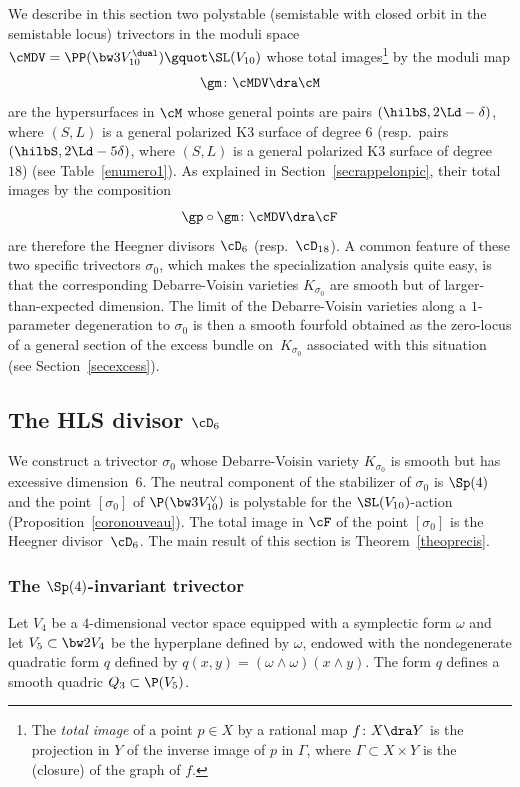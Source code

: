 We describe in this section two polystable (semistable with closed orbit in the semistable locus) trivectors in the moduli space
$\cMDV=\PP(\bw3 V_{10}^\dual) \gquot \SL(V_{10})
$ whose total images\footnote{The \emph{total image} of a point $p\in X$ by a rational map $f\colon X\dra Y$ is the projection in $Y$ of the inverse image of $p$ in $\Gamma$, where $\Gamma\subset X\times Y$ is the (closure) of the graph of $f$.} by the moduli map
\[
\gm\colon \cMDV\dra \cM
\]
are the hypersurfaces in $\cM$ whose general points are pairs $(\hilbS, 2\Ld- \delta)$, where $(S,L)$ is a general polarized K3 surface of degree 6 (resp.~pairs $(\hilbS, 2\Ld- 5\delta)$, where $(S,L)$ is a general polarized K3 surface of degree~$18$) (see Table~\ref{enumero1}). As explained in Section~\ref{secrappelonpic}, their total images
by the composition
\[
\gp\circ \gm\colon \cMDV\dra \cF
\]
are therefore the Heegner divisors $\cD_6$ (resp.~$\cD_{18}$).
A common feature of these two specific trivectors $\sigma_0$, which makes the specialization analysis
quite easy, is that the corresponding Debarre-Voisin varieties $K_{\sigma_0}$ are smooth but of larger-than-expected dimension. The limit
of the Debarre-Voisin varieties along a $1$-parameter degeneration to ${\sigma_0}$ is then
a smooth fourfold obtained as the zero-locus of a general section of the excess bundle on~$K_{\sigma_0}$ associated with this situation (see Section~\ref{secexcess}).

\subsection{The HLS divisor $\cD_{6}$}\label{sec51}
We construct a trivector $\sigma_0 $ whose
Debarre-Voisin variety $K_{\sigma_0}$ is smooth but has excessive dimension~$6$.
The neutral component of the stabilizer of $\sigma_0 $ is
$ \Sp(4)$ and the point $[\sigma_0]$ of $\P(\bw3V_{10}^\vee)$ is polystable for the $\SL(V_{10})$-action (Proposition~\ref{coronouveau}). The total image in $\cF$ of the point $[\sigma_0]$ is the Heegner divisor~$\cD_6$. The main result of this section is Theorem~\ref{theoprecis}.

\subsubsection{The $\Sp(4)$-invariant trivector}\label{sechivert}

Let $V_4$ be a $4$-dimensional vector space equipped with a symplectic form $\omega$ and let
$V_5\subset \bw2V_4 $ be the hyperplane defined by $\omega$, endowed with the nondegenerate quadratic form $q$ defined by $q(x,y)=(\omega \wedge\omega)(x\wedge y)$. The form $q$ defines a smooth quadric $Q_3\subset \P(V_5)$.

